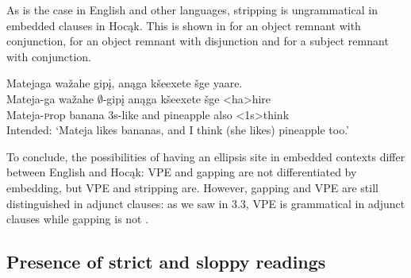 \documentclass[output=paper]{LSP/langsci}
\begin{document}
As is the case in English and other languages, stripping is ungrammatical in embedded clauses in Hocąk. This is shown in  for an object remnant with conjunction,  for an object remnant with disjunction and  for a subject remnant with conjunction.

\ea
\ea\label{ex:johnson:41a}
\glll Matejaga wažahe gipį, anąga kšeexete šge yaare.\\
Mateja-ga wažahe $\emptyset$-gipį anąga kšeexete šge <ha>hire\\
Mateja-{\textsc prop} banana {\textsc 3s}-like and pineapple also <{\textsc 1s}>think\\
\trans Intended: `Mateja likes bananas, and I think (she likes) pineapple too.'

\label{ex:johnson:41b}
\label{ex:johnson:41c}
\z
\z

To conclude, the possibilities of having an ellipsis site in embedded contexts differ between English and Hocąk: VPE and gapping are not differentiated by embedding, but VPE and stripping are. However, gapping and VPE are still distinguished in adjunct clauses: as we saw in 3.3, VPE is grammatical in adjunct clauses  while gapping is not .

\subsection{Presence of strict and sloppy readings}\label{sec:johnson:3.5}
\end{document}
